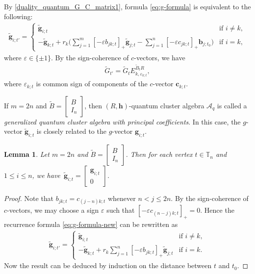 \documentclass[11pt]{article}
\numberwithin{equation}{section}
\numberwithin{equation}{section}
\newtheorem{Lemma}[Theorem]{Lemma}
\begin{document}
By \eqref{duality_quantum_G_C_matrix1}, formula \eqref{eq:g-formula} is equivalent to the following:
 \begin{align}\label{eq:g-formula-new}
 \mathbf{\tilde{g}}_{i;t'}=
 \begin{cases}
 \mathbf{\tilde{g}}_{i;t} & \text{if } i\neq k,\\
 \displaystyle -\mathbf{\tilde{g}}_{k;t}+r_{k}\biggl(\sum\limits_{j=1}^{m}[-\varepsilon b_{jk;t}]_+\mathbf{\tilde{g}}_{j;t}-\sum\limits_{j=1}^{n}[-\varepsilon c_{jk;t}]_+\mathbf{b}_{j;t_0}\biggr) & \text{if }i=k,
 \end{cases}
 \end{align}
 where $\varepsilon\in\{\pm 1\}$.
By the sign-coherence of $c$-vectors, we have
\begin{align}\label{eq:g-matrix}
 \tilde{G}_{t'}=\tilde{G}_{t}E_{k,\varepsilon_{k;t}}^{\tilde{B}_{t}R},
\end{align}
where $\varepsilon_{k;t}$ is common sign of components of the $c$-vector $\mathbf{c}_{k;t}$.

If $m=2n$ and $\tilde{B}=\left[\begin{smallmatrix}
 B\\ I_n
 \end{smallmatrix}\right]$, then $(R,\mathbf{h})$-quantum cluster algebra $\mathcal{A}_q$ is called a {\it generalized quantum cluster algebra with principal coefficients}. In this case, the $g$-vector $\tilde{\mathbf{g}}_{i;t}$ is closely related to the $g$-vector $\mathbf{g}_{i;t}$.
\begin{Lemma}\label{l:g-vector-comparison}
 Let $m=2n$ and $\tilde{B}=\left[\begin{smallmatrix}
 B\\ I_n
 \end{smallmatrix}\right]$. Then for each vertex $t\in \mathbb{T}_n$ and $1\leq i\leq n$, we have~${\tilde{\mathbf{g}}_{i;t}=\left[\begin{smallmatrix}
 \mathbf{g}_{i;t}\\ 0
 \end{smallmatrix}\right]}$.
\end{Lemma}
\begin{proof}
 Note that $b_{jk;t}=c_{(j-n)k;t}$ whenever $n<j\leq 2n$. By the sign-coherence of $c$-vectors, we may choose a sign $\varepsilon$ such that $[-\varepsilon c_{(n-j)k;t}]_+=0$. Hence the recurrence formula \eqref{eq:g-formula-new} can be rewritten as
 \begin{align*}
 \tilde{\mathbf{g}}_{i;t'}= \begin{cases}
 \mathbf{\tilde{g}}_{i;t} & \text{if } i\neq k,\\
 \displaystyle-\mathbf{\tilde{g}}_{k;t}+r_{k}\sum\limits_{j=1}^{n}[-\varepsilon b_{jk;t}]_+\mathbf{\tilde{g}}_{j;t} & \text{if }i=k.
 \end{cases}
 \end{align*}
 Now the result can be deduced by induction on the distance between $t$ and $t_0$.
\end{proof}
\end{document}
